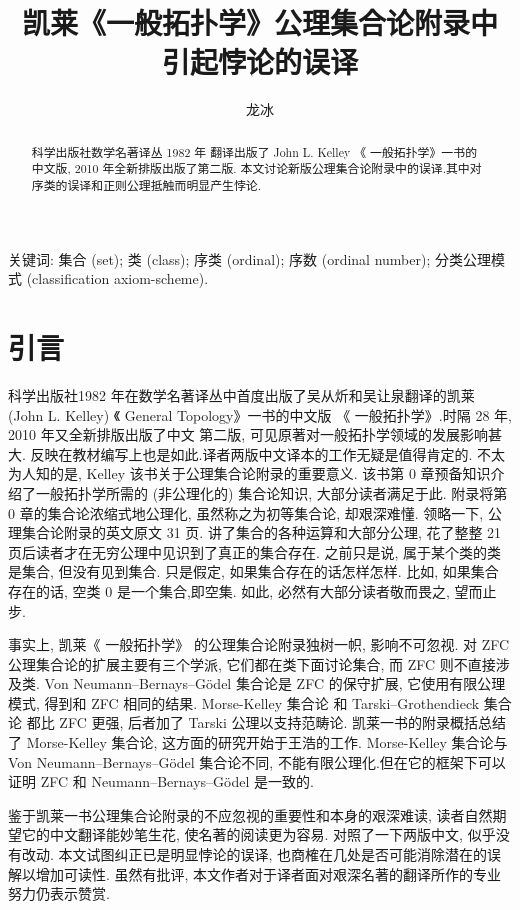 \documentclass[zihao=-4,a4paper]{ctexart}
\title{凯莱《一般拓扑学》公理集合论附录中\\ 引起悖论的误译}
\author{龙\quad 冰}
\date{}
\begin{document}
\maketitle
\begin{abstract}
科学出版社数学名著译丛 1982 年 翻译出版了 John L. Kelley 《 一般拓扑学》一书的中文版,  2010 年全新排版出版了第二版.
本文讨论新版公理集合论附录中的误译.其中对序类的误译和正则公理抵触而明显产生悖论.
\end{abstract}
	
关键词: 集合 (set); 类 (class); 序类 (ordinal); 
	序数 (ordinal number); 
	分类公理模式 (classification axiom-scheme).
	
	
	
\section{引言}
科学出版社1982 年在数学名著译丛中首度出版了吴从炘和吴让泉翻译的凯莱  (John L. Kelley) 《 General  Topology》\cite{jkelley1975}一书的中文版 《 一般拓扑学》.时隔 28 年, 2010 年又全新排版出版了中文 第二版\cite{jkelley2010zh}, 可见原著对一般拓扑学领域的发展影响甚大. 反映在教材编写上也是如此\cite{PuJiangHu1985}.译者两版中文译本的工作无疑是值得肯定的. 不太为人知的是, Kelley 该书关于公理集合论附录的重要意义. 该书第 0 章预备知识介绍了一般拓扑学所需的 (非公理化的) 集合论知识, 大部分读者满足于此. 
附录将第 0 章的集合论浓缩式地公理化, 虽然称之为初等集合论, 却艰深难懂. 领略一下, 公理集合论附录的英文原文 31 页. 讲了集合的各种运算和大部分公理, 花了整整 21 页后读者才在无穷公理中见识到了真正的集合存在. 之前只是说, 属于某个类的类是集合, 但没有见到集合. 只是假定, 如果集合存在的话怎样怎样. 比如, 如果集合存在的话, 空类 0 是一个集合,即空集. 如此, 必然有大部分读者敬而畏之, 望而止步. 

事实上, 凯莱《 一般拓扑学》 的公理集合论附录独树一帜, 影响不可忽视. 对 ZFC 公理集合论\cite{jjiang1991}\cite{enderton1977}的扩展主要有三个学派\cite{wikiSetTheory}, 它们都在类下面讨论集合, 而 ZFC 则不直接涉及类. Von Neumann–Bernays–Gödel 集合论\cite{wikiNBGSetTheory}是 ZFC 的保守扩展,  它使用有限公理模式, 得到和 ZFC 相同的结果. 
Morse-Kelley 集合论\cite{wikiMKSetTheory} 和 Tarski–Grothendieck 集合论\cite{wikiTGSetTheory} 都比 ZFC 更强, 后者加了 Tarski 公理以支持范畴论. 凯莱一书的附录概括总结了 Morse-Kelley 集合论,
这方面的研究开始于王浩的工作\cite{wang1949}. Morse-Kelley 集合论与 Von Neumann–Bernays–Gödel  集合论不同, 不能有限公理化.但在它的框架下可以证明 ZFC 和 Neumann–Bernays–Gödel 是一致的.

鉴于凯莱一书公理集合论附录的不应忽视的重要性和本身的艰深难读, 读者自然期望它的中文翻译能妙笔生花, 使名著的阅读更为容易. 对照了一下两版中文, 似乎没有改动. 本文试图纠正已是明显悖论的误译, 也商榷在几处是否可能消除潜在的误解以增加可读性. 虽然有批评, 本文作者对于译者面对艰深名著的翻译所作的专业努力仍表示赞赏.
	
\end{document}
